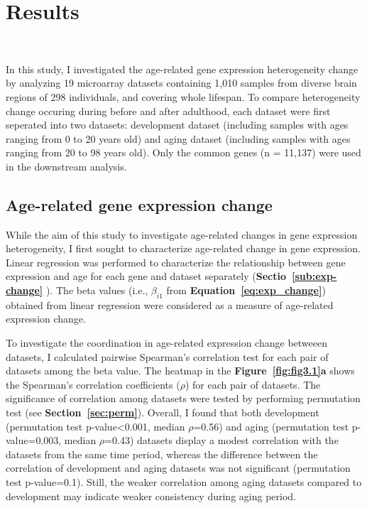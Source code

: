 \chapter{Results}~\label{chp:b3}

In this study, I investigated the age-related gene expression heterogeneity change by analyzing 19 microarray datasets
containing 1,010 samples from diverse brain regions of 298 individuals, and covering whole lifespan.
To compare heterogeneity change occuring during before and after adulthood, each dataset were first seperated into two datasets: development dataset 
(including samples with ages ranging from 0 to 20 years old) and aging dataset (including samples with ages ranging from 20 to 98 years old).
Only the common genes (n = 11,137) were used in the downstream analysis.

\section{Age-related gene expression change}
While the aim of this study to investigate age-related changes in gene expression heterogeneity, I first sought to characterize age-related change in gene expression.
Linear regression was performed to characterize the relationship between gene expression and age for each gene and dataset separately (\textbf{Sectio~\ref{sub:exp-change}} ).
The beta values (i.e., $\beta_{i1}$ from \textbf{Equation~\ref{eq:exp_change}}) obtained from linear regression were considered as a measure of age-related expression change.

To investigate the coordination in age-related expression change betweeen datasets, 
I calculated pairwise Spearman's correlation test for each pair of datasets among the beta value.
The heatmap in the \textbf{Figure~\ref{fig:fig3.1}a} shows the Spearman's correlation coefficients ($\rho$) for each pair of datasets.
The significance of correlation among datasets were tested by performing permutation test (see \textbf{Section~\ref{sec:perm}}).
Overall, I found that both development (permutation test p-value<0.001, median $\rho$=0.56) and aging (permutation test p-value=0.003, median $\rho$=0.43)
datasets display a modest correlation with the datasets from the same time period, 
whereas the difference between the correlation of development and aging datasets was not significant (permutation test p-value=0.1).
Still, the weaker correlation among aging datasets compared to development may indicate weaker consistency during aging period.

